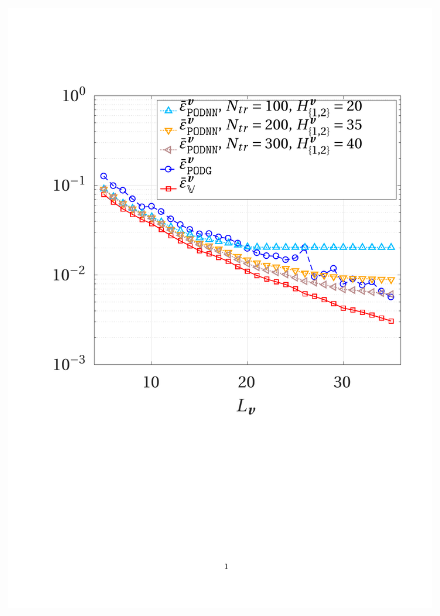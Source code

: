 \documentclass[12pt, a4paper, twoside, openright, notitlepage]{report}
\numberwithin{equation}{chapter}
\theoremstyle{theorem}
\theoremstyle{definition}
\theoremstyle{remark}
\theoremstyle{proposition}
\numberwithin{figure}{chapter}
\begin{document}
		\begin{figure}[t!]
			\center
			\includegraphics[scale = 0.44, trim = {2cm 9cm 1.5cm 3.5cm}, clip]{dc_400_vel_error_vs_rank}

\end{figure}
\end{document}
